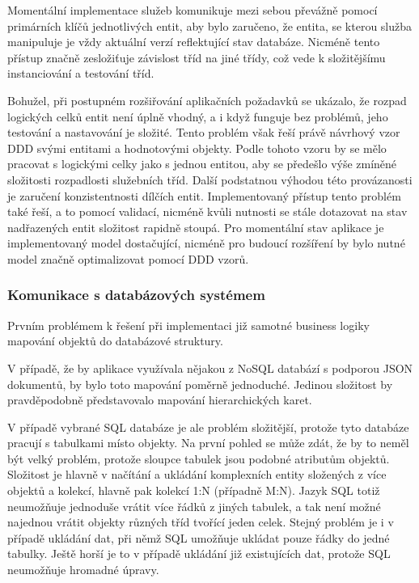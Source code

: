 		Momentální implementace služeb komunikuje mezi sebou převážně pomocí primárních klíčů jednotlivých entit, aby
		bylo zaručeno, že entita, se kterou služba manipuluje je vždy aktuální verzí reflektující stav databáze.
		Nicméně tento přístup značně zesložiťuje závislost tříd na jiné třídy, což vede k složitějšímu
		instanciování a testování tříd.

		Bohužel, při postupném rozšiřování aplikačních požadavků se ukázalo, že rozpad logických celků entit není úplně
		vhodný, a i když funguje bez problémů, jeho testování a nastavování je složité.
		Tento problém však řeší právě návrhový vzor \ac{DDD} svými entitami a hodnotovými objekty.
		Podle tohoto vzoru by se mělo pracovat s logickými celky jako s jednou entitou, aby se předešlo výše zmíněné složitosti
		rozpadlosti služebních tříd.
		Další podstatnou výhodou této provázanosti je zaručení konzistentnosti dílčích entit.
		Implementovaný přístup tento problém také řeší, a to pomocí validací, nicméně kvůli
		nutnosti se stále dotazovat na stav nadřazených entit složitost rapidně stoupá.
		\cite{ddd_quickly}
		Pro momentální stav aplikace je implementovaný model dostačující, nicméně pro budoucí rozšíření by bylo nutné
		model značně optimalizovat pomocí \ac{DDD} vzorů.

		\subsubsection{Komunikace s databázových systémem}

		Prvním problémem k řešení při implementaci již samotné business logiky mapování objektů do databázové struktury.

		V případě, že by aplikace využívala nějakou z \ac{NoSQL} databází s podporou \ac{JSON} dokumentů, by bylo toto
		mapování poměrně jednoduché.
		Jedinou složitost by pravděpodobně představovalo mapování hierarchických karet.

		V případě vybrané \ac{SQL} databáze je ale problém složitější, protože tyto databáze pracují s tabulkami místo objekty.
		Na první pohled se může zdát, že by to neměl být velký problém, protože sloupce tabulek jsou podobné atributům
		objektů.
		Složitost je hlavně v načítání a ukládání komplexních entity složených z více objektů a kolekcí, hlavně pak
		kolekcí 1:N (případně M:N).
		Jazyk \ac{SQL} totiž neumožňuje jednoduše vrátit více řádků z jiných tabulek, a tak není možné najednou
		vrátit objekty různých tříd tvořící jeden celek.
		Stejný problém je i v případě ukládání dat, při němž \ac{SQL} umožňuje ukládat pouze řádky do jedné tabulky.
		Ještě horší je to v případě ukládání již existujících dat, protože \ac{SQL} neumožňuje hromadné úpravy.

